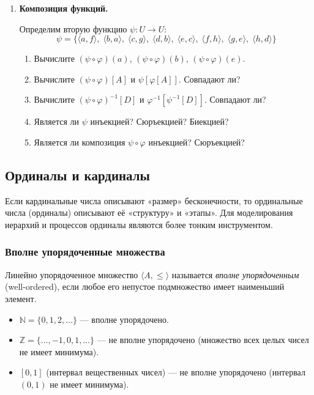 \documentclass[11pt, a4paper]{extarticle}
\newcommand{\ph}{\varphi}
\newcommand{\Z}{{\mathbb Z}}
\newcommand{\N}{{\mathbb N}}
\renewcommand{\le}{\leqslant}
\begin{document}
\begin{exercise}
\begin{enumerate}
\item \textbf{Композиция функций.}

Определим вторую функцию $\psi: U \to U$:
$$\psi = \{\langle a,f \rangle,\; \langle b,a \rangle,\; \langle c,g \rangle,\; \langle d,b \rangle,\; \langle e,c \rangle,\; \langle f,h \rangle,\; \langle g,e \rangle,\; \langle h,d \rangle\}$$
\begin{enumerate}[label=(\roman*), start=28]
    \item Вычислите $(\psi \circ \ph)(a)$, $(\psi \circ \ph)(b)$, $(\psi \circ \ph)(e)$.
    \item Вычислите $(\psi \circ \ph)[A]$ и $\psi[\ph[A]]$. Совпадают ли?
    \item Вычислите $(\psi \circ \ph)^{-1}[D]$ и $\ph^{-1}[\psi^{-1}[D]]$. Совпадают ли?
    \item Является ли $\psi$ инъекцией? Сюръекцией? Биекцией?
    \item Является ли композиция $\psi \circ \ph$ инъекцией? Сюръекцией?
\end{enumerate}

\end{enumerate}
\end{exercise}

\subsection{Ординалы и кардиналы}

Если кардинальные числа описывают «размер» бесконечности, то ординальные числа (ординалы) описывают её «структуру» и «этапы». Для моделирования иерархий и процессов ординалы являются более тонким инструментом.

\subsubsection{Вполне упорядоченные множества}

\quad

\begin{definition}
Линейно упорядоченное множество $\langle A, \le \rangle$ называется \textit{вполне упорядоченным} (well-ordered), если любое его непустое подмножество имеет наименьший элемент.
\end{definition}

\quad 


\begin{example}
\begin{itemize}
    \item $\N = \{0, 1, 2, \dots\}$ — вполне упорядочено.
    \item $\Z = \{\dots, -1, 0, 1, \dots\}$ — не вполне упорядочено (множество всех целых чисел не имеет минимума).
    \item $[0, 1]$ (интервал вещественных чисел) — не вполне упорядочено (интервал $(0, 1)$ не имеет минимума).
\end{itemize}
\end{example}
\end{document}
